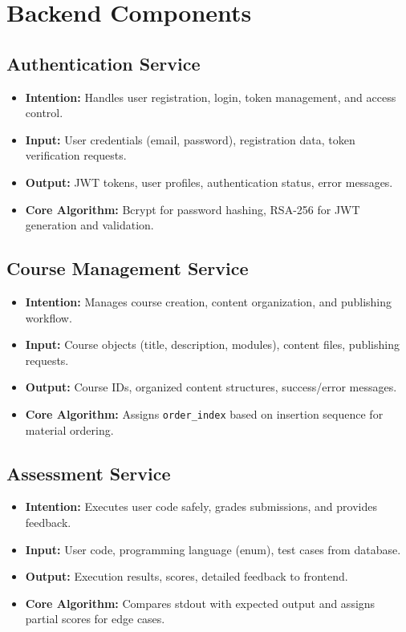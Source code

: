 \documentclass[a4paper, 11pt]{scrreprt}
\begin{document}
\section{Backend Components}

\subsection{Authentication Service}
\begin{itemize}
    \item \textbf{Intention:} Handles user registration, login, token management, and access control.
    \item \textbf{Input:} User credentials (email, password), registration data, token verification requests.
    \item \textbf{Output:} JWT tokens, user profiles, authentication status, error messages.
    \item \textbf{Core Algorithm:} Bcrypt for password hashing, RSA-256 for JWT generation and validation.
\end{itemize}

\subsection{Course Management Service}
\begin{itemize}
    \item \textbf{Intention:} Manages course creation, content organization, and publishing workflow.
    \item \textbf{Input:} Course objects (title, description, modules), content files, publishing requests.
    \item \textbf{Output:} Course IDs, organized content structures, success/error messages.
    \item \textbf{Core Algorithm:} Assigns \texttt{order\_index} based on insertion sequence for material ordering.
\end{itemize}

\subsection{Assessment Service}
\begin{itemize}
    \item \textbf{Intention:} Executes user code safely, grades submissions, and provides feedback.
    \item \textbf{Input:} User code, programming language (enum), test cases from database.
    \item \textbf{Output:} Execution results, scores, detailed feedback to frontend.
    \item \textbf{Core Algorithm:} Compares stdout with expected output and assigns partial scores for edge cases.
\end{itemize}
\end{document}
